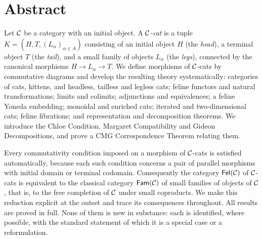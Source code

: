 \chapter*{Abstract}

Let $\mathcal{C}$ be a category with an initial object. A \emph{$\mathcal{C}$-cat} is a tuple
$K=(H,T,(L_\alpha)_{\alpha\in A})$ consisting of an initial object $H$ (the
\emph{head}), a terminal object $T$ (the \emph{tail}), and a small family of
objects $L_\alpha$ (the \emph{legs}), connected by the canonical morphisms
$H\to L_\alpha\to T$. We define morphisms of $\mathcal{C}$-cats by commutative diagrams
and develop the resulting theory systematically: categories of cats, kittens,
and headless, tailless and legless cats; feline functors and natural
transformations; limits and colimits; adjunctions and equivalences; a feline
Yoneda embedding; monoidal and enriched cats; iterated and two-dimensional
cats; feline fibrations; and representation and decomposition theorems. We
introduce the Chloe Condition, Margaret Compatibility and Gideon Decompositions,
and prove a CMG Correspondence Theorem relating them.

Every commutativity condition imposed on a morphism of $\mathcal{C}$-cats is satisfied
automatically, because each such condition concerns a pair of parallel
morphisms with initial domain or terminal codomain. Consequently the category
$\mathsf{Fel}(\mathcal{C})$ of $\mathcal{C}$-cats is equivalent to the classical category
$\mathsf{Fam}(\mathcal{C})$ of small families of objects of $\mathcal{C}$, that is, to the free
completion of $\mathcal{C}$ under small coproducts. We make this reduction explicit at
the outset and trace its consequences throughout. All results are proved in
full. None of them is new in substance: each is identified, where possible,
with the standard statement of which it is a special case or a reformulation.

